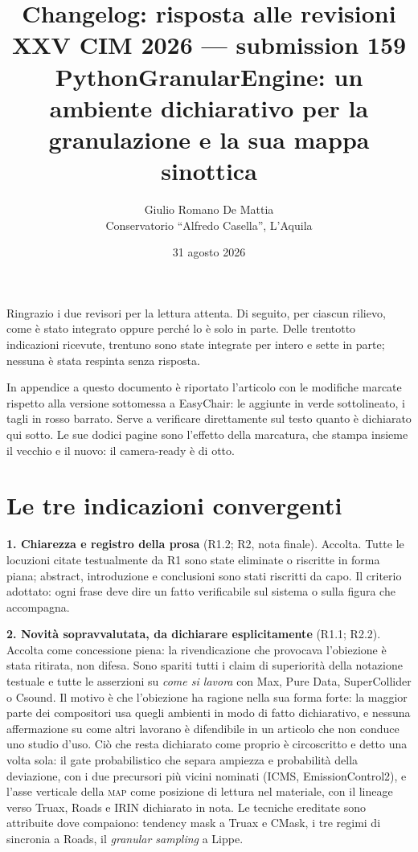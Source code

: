 \documentclass[11pt,a4paper]{article}
\title{\textbf{Changelog: risposta alle revisioni}\\[4pt]
\large XXV CIM 2026 --- submission 159\\
\normalsize PythonGranularEngine: un ambiente dichiarativo per la granulazione
e la sua mappa sinottica}
\author{Giulio Romano De Mattia\\ Conservatorio ``Alfredo Casella'', L'Aquila}
\date{31 agosto 2026}
\begin{document}
\maketitle

Ringrazio i due revisori per la lettura attenta. Di seguito, per ciascun
rilievo, come è stato integrato oppure perché lo è solo in parte. Delle
trentotto indicazioni ricevute, trentuno sono state integrate per intero e
sette in parte; nessuna è stata respinta senza risposta.

In appendice a questo documento è riportato l'articolo con le modifiche
marcate rispetto alla versione sottomessa a EasyChair: le aggiunte in verde
sottolineato, i tagli in rosso barrato. Serve a verificare direttamente sul
testo quanto è dichiarato qui sotto. Le sue dodici pagine sono l'effetto
della marcatura, che stampa insieme il vecchio e il nuovo: il camera-ready
è di otto.

\section*{Le tre indicazioni convergenti}

\textbf{1. Chiarezza e registro della prosa} (R1.2; R2, nota finale).
Accolta. Tutte le locuzioni citate testualmente da R1 sono state eliminate o
riscritte in forma piana; abstract, introduzione e conclusioni sono stati
riscritti da capo. Il criterio adottato: ogni frase deve dire un fatto
verificabile sul sistema o sulla figura che accompagna.

\textbf{2. Novità sopravvalutata, da dichiarare esplicitamente} (R1.1;
R2.2). Accolta come concessione piena: la rivendicazione che provocava
l'obiezione è stata ritirata, non difesa. Sono spariti tutti i claim di
superiorità della notazione testuale e tutte le asserzioni su \emph{come si
lavora} con Max, Pure Data, SuperCollider o Csound. Il motivo è che
l'obiezione ha ragione nella sua forma forte: la maggior parte dei
compositori usa quegli ambienti in modo di fatto dichiarativo, e nessuna
affermazione su come altri lavorano è difendibile in un articolo che non
conduce uno studio d'uso. Ciò che resta dichiarato come proprio è
circoscritto e detto una volta sola: il gate probabilistico che separa
ampiezza e probabilità della deviazione, con i due precursori più vicini
nominati (ICMS, EmissionControl2), e l'asse verticale della \textsc{map}
come posizione di lettura nel materiale, con il lineage verso Truax,
Roads e IRIN dichiarato in nota. Le tecniche ereditate sono attribuite dove
compaiono: tendency mask a Truax e CMask, i tre regimi di sincronia a Roads,
il \emph{granular sampling} a Lippe.
\end{document}
